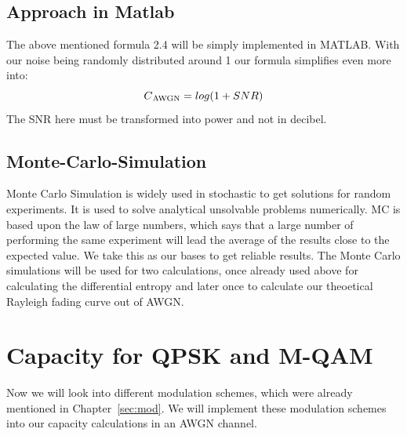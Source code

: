 \documentclass[12pt,oneside, reqno]{report}
\begin{document}
\subsection{Approach in Matlab}
The above mentioned formula 2.4 will be simply implemented in MATLAB. With our noise being randomly distributed around 1 our formula simplifies even more into:
\begin{equation}
\label{eq:AWGN}
C\textsubscript{AWGN} = log(1+SNR) 
\end{equation} 
The SNR here must be transformed into power and not in decibel.

\subsection{Monte-Carlo-Simulation}
Monte Carlo Simulation is widely used in stochastic to get solutions for random experiments. It is used to solve analytical unsolvable problems numerically. MC is based upon the law of large numbers, which says that a large number of performing the same experiment will lead the average of the results close to the expected value. We take this as our bases to get reliable results. The Monte Carlo simulations will be used for two calculations, once already used above for calculating the differential entropy and later once to calculate our theoetical Rayleigh fading curve out of AWGN. 

\section{Capacity for QPSK and M-QAM}
Now we will look into different modulation schemes, which were already mentioned in Chapter~\autoref{sec:mod}. We will implement these modulation schemes into our capacity calculations in an AWGN channel.
\end{document}

